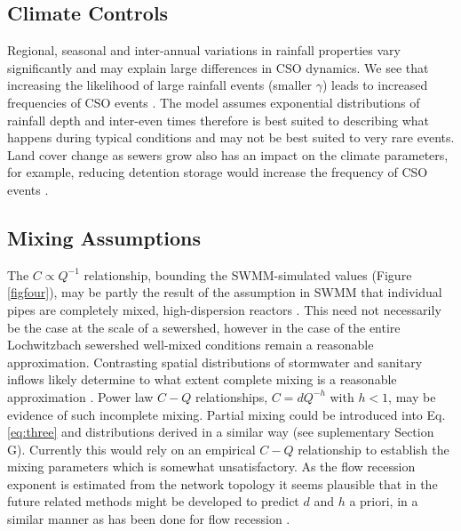 \documentclass[draft,linenumbers]{agujournal2018}
\begin{document}
\subsection{Climate Controls}
Regional, seasonal and inter-annual variations in rainfall properties vary signif\/icantly and may explain large dif\/ferences in CSO dynamics. We see that increasing the likelihood of large rainfall events (smaller $\gamma$) leads to increased frequencies of CSO events \cite{Sterk_2016}. The model assumes exponential distributions of rainfall depth and inter-even times therefore is best suited to describing what happens during typical conditions and may not be best suited to very rare events. Land cover change as sewers grow also has an impact on the climate parameters, for example, reducing detention storage would increase the frequency of CSO events \citep{Riechel_2016}.

\subsection{Mixing Assumptions}
The $C \propto Q^{-1}$ relationship, bounding the SWMM-simulated values (Figure \ref{figfour}), may be partly the result of the assumption in SWMM that individual pipes are completely mixed, high-dispersion reactors \citep{Rossmann2010}. This need not necessarily be the case at the scale of a sewershed, however in the case of the entire Lochwitzbach sewershed well-mixed conditions remain a reasonable approximation. Contrasting spatial distributions of stormwater and sanitary inf\/lows likely determine to what extent complete mixing is a reasonable approximation \citep{Krebs_1999}. Power law $C-Q$ relationships, $C = d Q^{-h}$ with $h < 1$, may be evidence of such incomplete mixing. Partial mixing could be introduced into Eq. \ref{eq:three} and distributions derived in a similar way (see suplementary Section G). Currently this would rely on an empirical $C-Q$ relationship to establish the mixing parameters which is somewhat unsatisfactory. As the f\/low recession exponent is estimated from the network topology it seems plausible that in the future related methods might be developed to predict $d$ and $h$ a priori, in a similar manner as has been done for f\/low recession \citep{Biswal_2014}.
\end{document}

